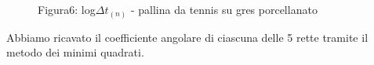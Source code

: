 \documentclass[a4paper]{article}
\theoremstyle{definition}
\begin{document}
	\begin{figure}[!ht]
		\captionsetup{labelformat=empty}
		\caption{Figura6: log\(\Delta t_{(n)}\) - pallina da tennis su gres porcellanato}
	\end{figure}
	
	\noindent Abbiamo ricavato il coefficiente angolare di ciascuna delle 5 rette tramite il metodo dei minimi quadrati.
		\begin{figure}[!ht]
		\captionsetup{labelformat=empty}

	\end{figure}
	
\end{document}

